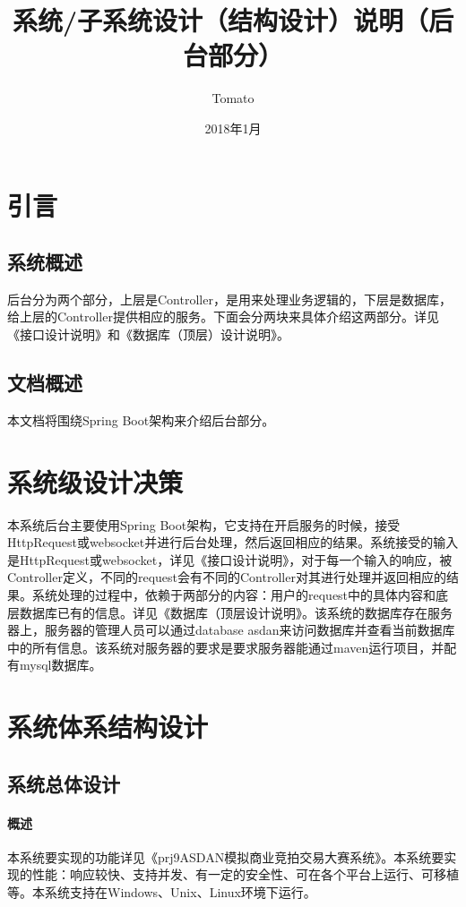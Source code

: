 \documentclass{article}
\title{系统/子系统设计（结构设计）说明（后台部分）}
\author{Tomato}
\date{2018年1月}
\begin{document}
    \maketitle
        \section{引言}
            \subsection{系统概述}
                后台分为两个部分，上层是Controller，是用来处理业务逻辑的，下层是数据库，给上层的Controller提供相应的服务。下面会分两块来具体介绍这两部分。详见《接口设计说明》和《数据库（顶层）设计说明》。

            \subsection{文档概述}
                本文档将围绕Spring Boot架构来介绍后台部分。
        \section{系统级设计决策}
            本系统后台主要使用Spring Boot架构，它支持在开启服务的时候，接受HttpRequest或websocket并进行后台处理，然后返回相应的结果。系统接受的输入是HttpRequest或websocket，详见《接口设计说明》，对于每一个输入的响应，被Controller定义，不同的request会有不同的Controller对其进行处理并返回相应的结果。系统处理的过程中，依赖于两部分的内容：用户的request中的具体内容和底层数据库已有的信息。详见《数据库（顶层{设计说明}》。该系统的数据库存在服务器上，服务器的管理人员可以通过database asdan来访问数据库并查看当前数据库中的所有信息。该系统对服务器的要求是要求服务器能通过maven运行项目，并配有mysql数据库。
        \section{系统体系结构设计}
            \subsection{系统总体设计}
                \paragraph{概述}
                    本系统要实现的功能详见《prj9ASDAN模拟商业竞拍交易大赛系统》。本系统要实现的性能：响应较快、支持并发、有一定的安全性、可在各个平台上运行、可移植等。本系统支持在Windows、Unix、Linux环境下运行。
\end{document}
